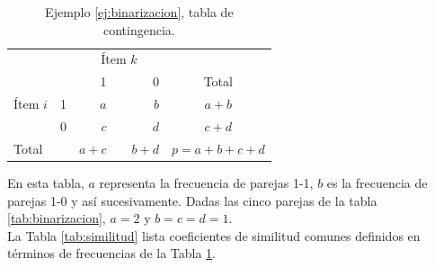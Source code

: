 \documentclass[a4paper, 20pt]{article}
\begin{document}
\begin{table}[H]
  \centering
  \caption{Ejemplo \ref{ej:binarizacion}, tabla de contingencia.}
  \label{tab:contingencia}
\resizebox{7cm}{!} {
  \begin{tabular}{llrrrrr}
    \toprule
\multicolumn{2}{l}{\multirow{2}{*}{}} & \multicolumn{3}{c}{Ítem $k$} & \multicolumn{2}{c}{} \\\cmidrule{3-5}
\multicolumn{2}{l}{}                  & 1        &       & 0       & \multicolumn{2}{c}{{Total}}                        \\
\midrule
{Ítem $i$}       & 1      & $a$        &       & $b$       & \multicolumn{2}{c}{$a+b$}                     \\
                              & 0      & $c$        &       & $d$       & \multicolumn{2}{c}{$c+d$}                     \\ \midrule
\multicolumn{2}{l}{Total}            & $a+c$      &       & $b+d$     & \multicolumn{2}{c}{$p=a+b+c+d$}\\
\bottomrule
\end{tabular}
}
\end{table}

En esta tabla, $a$ representa la frecuencia de parejas 1-1,  $b$ es la frecuencia de parejas 1-0 y así sucesivamente. Dadas las cinco parejas de la tabla \ref{tab:binarizacion}, $a=2$ y $b=c=d=1$.\\

La Tabla \ref{tab:similitud} lista coeficientes de similitud comunes definidos en términos de frecuencias de la Tabla \ref{tab:contingencia}.
\end{document}
